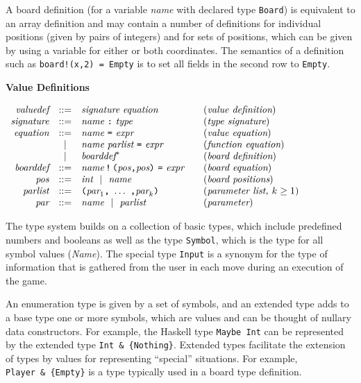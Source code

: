 \documentclass[11pt]{article}
\makeatletter
\newcommand{\prodName}[1]{&(\emph{#1})\\}
\newcommand{\nt}[1]{\textit{#1}}
\newcommand{\prog}[1]{\texttt{#1}}
\newcommand{\ORil}{\ \ |\ \ }
\newcommand{\IS}{&::=&}
\newcommand{\OR}{&|&}
\newcommand{\syntax}[2]{
  \needspace{3\baselineskip}
  \bigskip\par\noindent\textbf{#1}\par\smallskip%
  $\begin{array}{rcl@{\qquad}l}#2\end{array}$%
  \par\bigskip\noindent\ignorespaces
}
\newcommand{\lp}{\prog{(}}
\newcommand{\rp}{\prog{)}}
\newcommand{\paren}[1]{\lp#1\rp}
\newcommand{\pair}[2]{\paren{#1\prog{,}#2}}
\makeatother
\begin{document}
A board definition (for a variable \nt{name} with declared type \prog{Board})
is equivalent to an array definition and may contain a number of definitions
for individual positions (given by pairs of integers) and for sets of
positions, which can be given by using a variable for either or both
coordinates. The semantics of a definition such as \prog{board!(x,2)~=~Empty}
is to set all fields in the second row to \prog{Empty}.

\syntax{Value Definitions}{
\nt{valuedef}  \IS \nt{signature}\ \nt{equation}   \prodName{value definition}
\nt{signature} \IS \nt{name}\ \prog{:}\ \nt{type}  \prodName{type signature}
\nt{equation}  \IS \nt{name}\ \prog{=}\ \nt{expr}  \prodName{value equation}
               \OR \nt{name}\ \nt{parlist}\ \prog{=}\ \nt{expr}
                   \prodName{function equation}
               \OR \nt{boarddef}^*                  \prodName{board definition}
\nt{boarddef}  \IS \nt{name}\,\prog{!}\,\pair{\nt{pos}}{\nt{pos}}\ \prog{=}\ \nt{expr}
                   \prodName{board equation}
\nt{pos}       \IS \nt{int} \ORil \nt{name}      \prodName{board positions}
\nt{parlist}   \IS \paren{\nt{par}_1\prog{,}\ \ldots\ \prog{,}\nt{par}_k}
                   \prodName{parameter list, $k\geq 1$}
\nt{par}       \IS \nt{name} \ORil \nt{parlist}   \prodName{parameter}
}
%
The type system builds on a collection of basic types, which include
predefined numbers and booleans as well as the type \prog{Symbol}, which is the
type for all symbol values (\nt{Name}).
%
%
The special type \prog{Input} is a synonym for the type of information that is
gathered from the user in each move during an execution of the game.
%

An enumeration type is given by a set of symbols, and an  extended type adds to
a base type one or more symbols, which are values and can be thought of nullary
data constructors. For example, the Haskell type \prog{Maybe Int} can be
represented by the extended type \prog{Int~\&~\{Nothing\}}. Extended types
facilitate the extension of types by values for representing ``special''
situations. For example, \prog{Player~\&~\{Empty\}} is a type typically used in
a board type definition.
\end{document}
